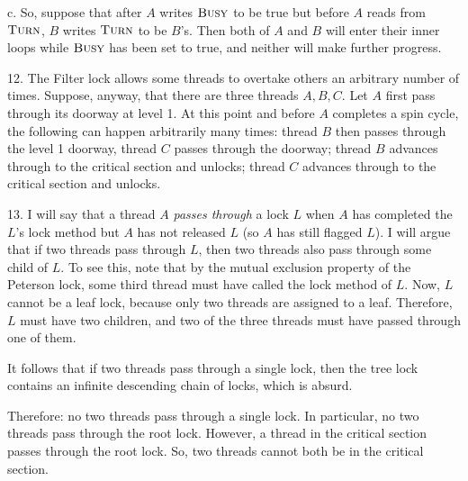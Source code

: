 c. So, suppose that after $A$ writes $\textsc{Busy}$ to be true but before $A$ reads from $\textsc{Turn}$,  $B$ writes $\textsc{Turn}$ to be $B$'s.  Then both of $A$ and $B$ will enter their inner loops while $\textsc{Busy}$ has been set to true, and neither will make further progress.

12. The Filter lock allows some threads to overtake others an arbitrary number of times.  Suppose, anyway, that there are three threads $A, B, C$.  Let $A$ first pass through its doorway at level 1.  At this point and before $A$ completes a spin cycle, the following can happen arbitrarily many times: thread $B$ then passes through the level 1 doorway, thread $C$ passes through the doorway; thread $B$ advances through to the critical section and unlocks; thread $C$ advances through to the critical section and unlocks.

13. I will say that a thread $A$ \emph{passes through} a lock $L$ when $A$ has completed the $L$'s lock method but $A$ has not released $L$ (so $A$ has still flagged $L$).  I will argue that if two threads pass through $L$, then two threads also pass through some child of $L$.  To see this, note that by the mutual exclusion property of the Peterson lock, some third thread must have called the lock method of $L$.  Now, $L$ cannot be a leaf lock, because only two threads are assigned to a leaf.  Therefore, $L$ must have two children, and two of the three threads must have passed through one of them.  

It follows that if two threads pass through a single lock, then the tree lock contains an infinite descending chain of locks, which is absurd.

Therefore: no two threads pass through a single lock.  In particular, no two threads pass through the root lock.  However, a thread in the critical section passes through the root lock.  So, two threads cannot both be in the critical section.

